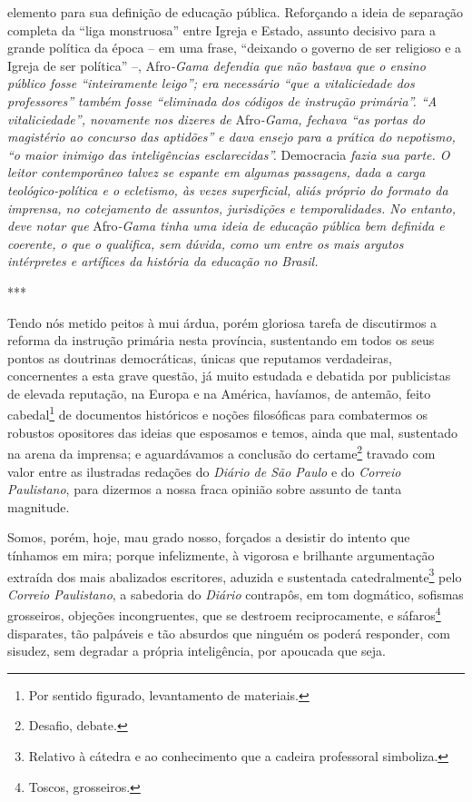 \begin{didascalia}
{elemento para sua definição de educação pública. Reforçando a ideia de
separação completa da ``liga monstruosa'' entre Igreja e Estado, assunto
decisivo para a grande política da época -- em uma frase,
``deixando o governo de ser religioso e a Igreja de ser política''
--,} Afro\emph{-Gama defendia que não bastava que o ensino público fosse
``inteiramente leigo''; era necessário ``que a vitaliciedade dos
professores'' também fosse ``eliminada dos códigos de instrução primária''.
``A vitaliciedade'', novamente nos dizeres de} Afro\emph{-Gama, fechava
``as portas do magistério ao concurso das aptidões'' e dava ensejo para a
prática do nepotismo, ``o maior inimigo das inteligências esclarecidas''.}
Democracia \emph{fazia sua parte. O leitor contemporâneo talvez se
espante em algumas passagens, dada a carga teológico-política e o
ecletismo, às vezes superficial, aliás próprio do formato da imprensa,
no cotejamento de assuntos, jurisdições e temporalidades. No entanto,
deve notar que} Afro\emph{-Gama tinha uma ideia de educação pública bem
definida e coerente, o que o qualifica, sem dúvida, como um entre os
mais argutos intérpretes e artífices da história da educação no Brasil.}
\end{didascalia}

***

Tendo nós metido peitos à mui árdua, porém gloriosa tarefa de
discutirmos a reforma da instrução primária nesta província, sustentando
em todos os seus pontos as doutrinas democráticas, únicas que reputamos
verdadeiras, concernentes a esta grave questão, já muito estudada e
debatida por publicistas de elevada reputação, na Europa e na América,
havíamos, de antemão, feito cabedal\footnote{Por sentido figurado,
  levantamento de materiais.} de documentos históricos e noções
filosóficas para combatermos os robustos opositores das ideias que
esposamos e temos, ainda que mal, sustentado na arena da imprensa; e
aguardávamos a conclusão do certame\footnote{Desafio, debate.} travado
com valor entre as ilustradas redações do \emph{Diário de São Paulo} e do
\emph{Correio Paulistano}, para dizermos a nossa fraca opinião sobre
assunto de tanta magnitude.

Somos, porém, hoje, mau grado nosso, forçados a desistir do intento que
tínhamos em mira; porque infelizmente, à vigorosa e brilhante
argumentação extraída dos mais abalizados escritores, aduzida e
sustentada catedralmente\footnote{Relativo à cátedra e ao conhecimento
  que a cadeira professoral simboliza.} pelo \emph{Correio Paulistano},
a sabedoria do \emph{Diário} contrapôs, em tom dogmático, sofismas
grosseiros, objeções incongruentes, que se destroem reciprocamente, e
sáfaros\footnote{Toscos, grosseiros.} disparates, tão palpáveis e tão
absurdos que ninguém os poderá responder, com sisudez, sem degradar a
própria inteligência, por apoucada que seja.

